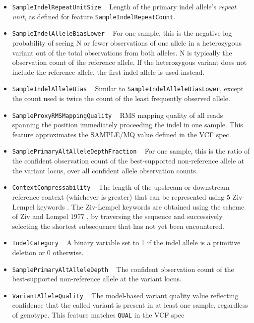 \documentclass{article}
\begin{document}
\begin{itemize}
    \item \texttt{SampleIndelRepeatUnitSize} ~ Length of the primary indel allele's \emph{repeat unit}, as defined for feature \texttt{SampleIndelRepeatCount}.

    \item \texttt{SampleIndelAlleleBiasLower} ~ For one sample, this is the negative log probability of seeing N or fewer observations of one allele in a heterozygous variant out of the total observations from both alleles. N is typically the observation count of the reference allele. If the heterozygous variant does not include the reference allele, the first indel allele is used instead.

    \item \texttt{SampleIndelAlleleBias} ~ Similar to \texttt{SampleIndelAlleleBiasLower}, except the count used is twice the count of the least frequently observed allele.

    \item \texttt{SampleProxyRMSMappingQuality} ~ RMS mapping quality of all reads spanning the position immediately proceeding the indel in one sample. This feature approximates the SAMPLE/MQ value defined in the VCF spec.

    \item \texttt{SamplePrimaryAltAlleleDepthFraction} ~ For one sample, this is the ratio of the confident observation count of the best-supported non-reference allele at the variant locus, over all confident allele observation counts.

    \item \texttt{ContextCompressability} ~ The length of the upstream or downstream reference context (whichever is greater) that can be represented using 5 Ziv-Lempel keywords \cite{lesne2009,ziv1977}. The Ziv-Lempel keywords are obtained using the scheme of Ziv and Lempel 1977 \cite{ziv1977}, by traversing the sequence and successively selecting the shortest subsequence that has not yet been encountered.

    \item \texttt{IndelCategory} ~ A binary variable set to 1 if the indel allele is a primitive deletion or 0 otherwise.

    \item \texttt{SamplePrimaryAltAlleleDepth} ~ The confident observation count of the best-supported non-reference allele at the variant locus.

    \item \texttt{VariantAlleleQuality} ~ The model-based variant quality value reflecting confidence that the called variant is present in at least one sample, regardless of genotype. This feature matches \texttt{QUAL} in the VCF spec


\end{itemize}
\end{document}
